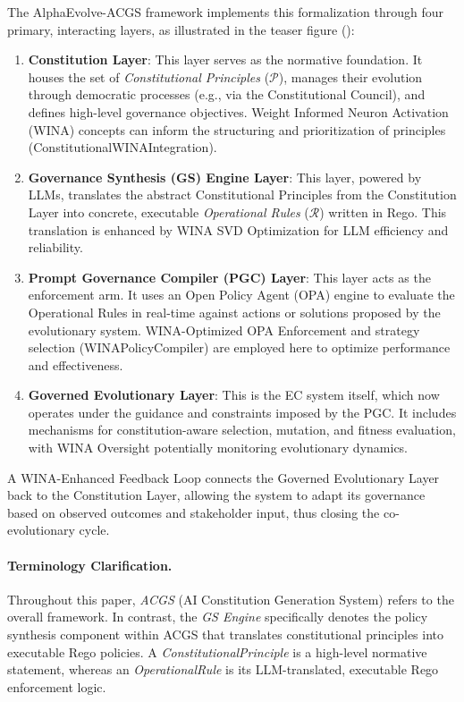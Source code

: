 \documentclass[manuscript,screen,review,anonymous,9pt]{acmart}
\begin{document}
The AlphaEvolve-ACGS framework implements this formalization through four primary, interacting layers, as illustrated in the teaser figure ():
\begin{enumerate}[leftmargin=*,itemsep=1pt,parsep=1pt]
    \item \textbf{Constitution Layer}: This layer serves as the normative foundation. It houses the set of \textit{Constitutional Principles} ($\mathcal{P}$), manages their evolution through democratic processes (e.g., via the Constitutional Council), and defines high-level governance objectives. Weight Informed Neuron Activation (WINA) \cite{WINA2024NeuronActivation} concepts can inform the structuring and prioritization of principles (ConstitutionalWINAIntegration).
    \item \textbf{Governance Synthesis (GS) Engine Layer}: This layer, powered by LLMs, translates the abstract Constitutional Principles from the Constitution Layer into concrete, executable \textit{Operational Rules} ($\mathcal{R}$) written in Rego. This translation is enhanced by WINA SVD Optimization for LLM efficiency and reliability.
    \item \textbf{Prompt Governance Compiler (PGC) Layer}: This layer acts as the enforcement arm. It uses an Open Policy Agent (OPA) engine to evaluate the Operational Rules in real-time against actions or solutions proposed by the evolutionary system. WINA-Optimized OPA Enforcement and strategy selection (WINAPolicyCompiler) are employed here to optimize performance and effectiveness.
    \item \textbf{Governed Evolutionary Layer}: This is the EC system itself, which now operates under the guidance and constraints imposed by the PGC. It includes mechanisms for constitution-aware selection, mutation, and fitness evaluation, with WINA Oversight potentially monitoring evolutionary dynamics.
\end{enumerate}
A WINA-Enhanced Feedback Loop connects the Governed Evolutionary Layer back to the Constitution Layer, allowing the system to adapt its governance based on observed outcomes and stakeholder input, thus closing the co-evolutionary cycle.

\paragraph{Terminology Clarification.} Throughout this paper, \textit{ACGS} (AI Constitution Generation System) refers to the overall framework. In contrast, the \textit{GS Engine} specifically denotes the policy synthesis component within ACGS that translates constitutional principles into executable Rego policies. A \textit{ConstitutionalPrinciple} is a high-level normative statement, whereas an \textit{OperationalRule} is its LLM-translated, executable Rego enforcement logic.
\end{document}
